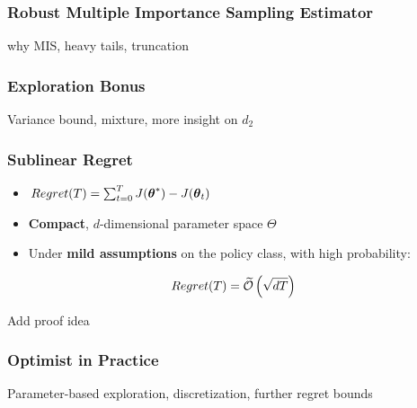 \documentclass[aspectratio=169, table]{beamer}
\newcommand{\enb}[1]{\textcolor{poliblue1}{\textbf{#1}}}
\begin{document}
\begin{frame}
\begin{overlayarea}{\textwidth}{.25\textheight}
{}
\end{overlayarea}
\end{frame}

\begin{frame}
\frametitle{Robust Multiple Importance Sampling Estimator}
why MIS, heavy tails, truncation
\end{frame}

\begin{frame}
\frametitle{Exploration Bonus}
Variance bound, mixture, more insight on $d_2$
\end{frame}

\begin{frame} 
\frametitle{Sublinear Regret}
\begin{overlayarea}{\textwidth}{.4\textheight}
\begin{itemize}
	\setlength{\itemsep}{20pt}
	\item<1-> $\mathop{Regret}(T) = \sum_{t=0}^T J(\boldsymbol{\theta}^*) - J(\boldsymbol{\theta}_t)$
	\vfill
	\item<2-> \enb{Compact}, $d$-dimensional parameter space $\Theta$
	\vfill
	\item<3-> Under \enb{mild assumptions} on the policy class, with high probability:
\end{itemize}
\end{overlayarea}
\LARGE
\begin{align*}
\mathop{Regret}(T) = \widetilde{\mathcal{O}}\left(\sqrt{dT}\right)
\end{align*}

Add proof idea

\end{frame}

\begin{frame} 
\frametitle{Optimist in Practice}
Parameter-based exploration, discretization, further regret bounds
\end{frame}
\end{document}
